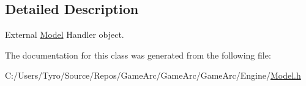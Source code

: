 \subsection{Detailed Description}
External \mbox{\hyperlink{class_model}{Model}} Handler object. 

The documentation for this class was generated from the following file\+:\begin{DoxyCompactItemize}
\item 
C\+:/\+Users/\+Tyro/\+Source/\+Repos/\+Game\+Arc/\+Game\+Arc/\+Game\+Arc/\+Engine/\mbox{\hyperlink{_model_8h}{Model.\+h}}\end{DoxyCompactItemize}
